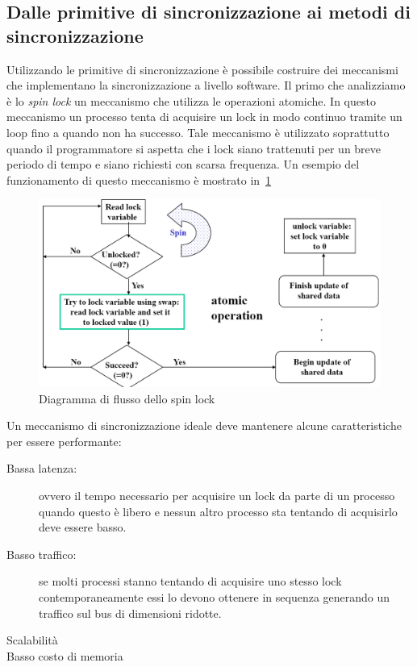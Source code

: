 \subsection{Dalle primitive di sincronizzazione ai metodi di sincronizzazione}
Utilizzando le primitive di sincronizzazione è possibile costruire dei meccanismi che implementano la sincronizzazione a livello software. Il primo che analizziamo è lo \emph{spin lock} un meccanismo che utilizza le operazioni atomiche. In questo meccanismo un processo tenta di acquisire un lock in modo continuo tramite un loop fino a quando non ha successo. Tale meccanismo è utilizzato soprattutto quando il programmatore si aspetta che i lock siano trattenuti per un breve periodo di tempo e siano richiesti con scarsa frequenza. Un esempio del funzionamento di questo meccanismo è mostrato in \figurename\,\ref{fig:spinlock}
\begin{figure}[htb]
\centering
\includegraphics[scale=0.5]{img/spinlock.png}
\caption{Diagramma di flusso dello spin lock}\label{fig:spinlock}
\end{figure}
Un meccanismo di sincronizzazione ideale deve mantenere alcune caratteristiche per essere performante:
\begin{description}
\item[Bassa latenza:] ovvero il tempo necessario per acquisire un lock da parte di un processo quando questo è libero e nessun altro processo sta tentando di acquisirlo deve essere basso.
\item[Basso traffico:] se molti processi stanno tentando di acquisire uno stesso lock contemporaneamente essi lo devono ottenere in sequenza generando un traffico sul bus di dimensioni ridotte.
\item[Scalabilità]
\item[Basso costo di memoria]
\end{description}
